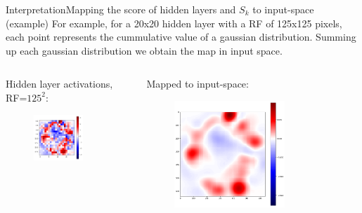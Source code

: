 \documentclass{beamer}
\begin{document}
\begin{frame}{Interpretation}{Mapping the score of hidden layers and $S_k$ to input-space (example)}
For example, for a 20x20 hidden layer with a RF of 125x125 pixels, each point represents the cummulative value of a gaussian distribution. Summing up each gaussian distribution we obtain the map in input space.\hfill\break

\begin{columns}
	\begin{column}{0.5\textwidth}
		\alert{Hidden layer activations, RF=$125^2$:}
		\begin{figure}
			\centering
			\includegraphics[width=0.7\textwidth]{./chapter_interpretation/activations_rf125.png}
		\end{figure}		
	\end{column}
	
	\begin{column}{0.5\textwidth}
		\alert{Mapped to input-space:}
		\begin{figure}
			\centering
			\includegraphics[width=0.7\textwidth]{./chapter_interpretation/input_space_mapping_using_a_2std_gaussian_prior_rf125.png}
		\end{figure}
	\end{column}
\end{columns}

\end{frame}
\end{document}
